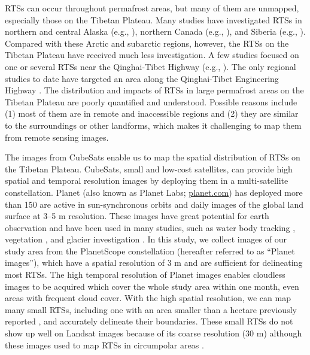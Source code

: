\documentclass[authoryear,preprint,review,12pt]{elsarticle}
\begin{document}
RTSs can occur throughout permafrost areas, but many of them are unmapped, especially those on the Tibetan Plateau. Many studies have investigated RTSs in northern and central Alaska (e.g., \citealp{swanson2018growth,balser2014timing}), northern Canada (e.g., \citealp{burn1990canadian, cassidy2017impacts, armstrong2018thaw,lewkowicz2019extremes}), and Siberia (e.g., \citealp{leibman2003dynamics, zwieback2018sub}). %
Compared with these Arctic and subarctic regions, however, the RTSs on the Tibetan Plateau have received much less investigation. 
A few studies focused on one or several RTSs near the Qinghai-Tibet Highway (e.g., \citealp{wang1995situ,sun2017creep}). The only regional studies to date have targeted an area along the Qinghai-Tibet Engineering Highway \citep{niu2014thaw, niu2016thaw}. 
The distribution and impacts of RTSs in large permafrost areas on the Tibetan Plateau are poorly quantified and understood. 
Possible reasons include (1) most of them are in remote and inaccessible regions and (2) they are similar to the surroundings or other landforms, which makes it challenging to map them from remote sensing images.

The images from CubeSats enable us to map the spatial distribution of RTSs on the Tibetan Plateau. CubeSats, small and low-cost satellites, can provide high spatial and temporal resolution images by deploying them in a multi-satellite constellation.  Planet (also known as Planet Labs; \url{planet.com}) has deployed  more than 150  are active in sun-synchronous orbits and  daily images of the global land surface at 3--5 m resolution. These images have great potential for earth observation and have been used in many studies, such as water body tracking \citep{cooley2017tracking, cooley2019arctic, aragon2018cubesats, miles2018glacial}, vegetation \citep{houborg2016high, houborg2018daily}, and glacier investigation \citep{altena2017glacier}. In this study, we collect images of our study area from the PlanetScope constellation (hereafter referred to as “Planet images”), which have a spatial resolution of 3 m and are sufficient for delineating most RTSs. The high temporal resolution of Planet images enables cloudless images to be acquired which cover the whole study area within one month, even  areas with frequent cloud cover. With the high spatial resolution, we can map many small RTSs, including one with an area smaller than a hectare previously reported \cite{niu2012development,niu2016thaw}, and accurately delineate their boundaries. These small RTSs do not show up well on Landsat images because of its coarse resolution (30 m) although these images  used to map RTSs  in circumpolar areas \citep{lacelle_distribution_2015, brooker2014mapping, nitze2018remote}. %
\end{document}
